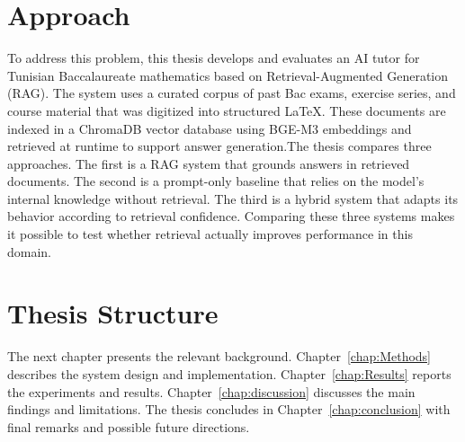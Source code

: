 \section{Approach}
To address this problem, this thesis develops and evaluates an AI tutor for Tunisian Baccalaureate mathematics based on Retrieval-Augmented Generation (RAG). The system uses a curated corpus of past Bac exams, exercise series, and course material that was digitized into structured \LaTeX{}. These documents are indexed in a ChromaDB vector database using BGE-M3 embeddings and retrieved at runtime to support answer generation.The thesis compares three approaches. The first is a RAG system that grounds answers in retrieved documents. The second is a prompt-only baseline that relies on the model's internal knowledge without retrieval. The third is a hybrid system that adapts its behavior according to retrieval confidence. Comparing these three systems makes it possible to test whether retrieval actually improves performance in this domain.

\section{Thesis Structure}
The next chapter presents the relevant background. Chapter~\ref{chap:Methods} describes the system design and implementation. Chapter~\ref{chap:Results} reports the experiments and results. Chapter~\ref{chap:discussion} discusses the main findings and limitations. The thesis concludes in Chapter~\ref{chap:conclusion} with final remarks and possible future directions.
